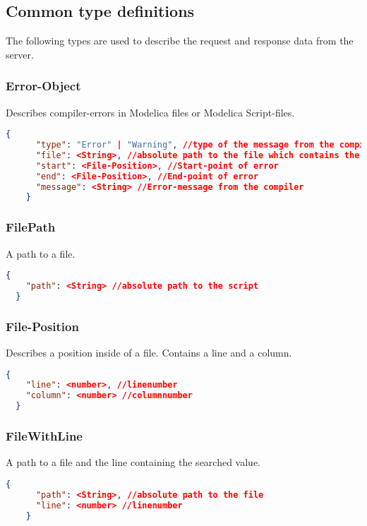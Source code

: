 \subsection{Common type definitions}
The following types are used to describe the request and response data
from the server.

\subsubsection{Error-Object}
Describes compiler-errors in Modelica files or Modelica Script-files.
\newline{}
  \begin{lstlisting}[basicstyle=\small,language=json]
    {
      "type": "Error" | "Warning", //type of the message from the compiler
      "file": <String>, //absolute path to the file which contains the error
      "start": <File-Position>, //Start-point of error
      "end": <File-Position>, //End-point of error
      "message": <String> //Error-message from the compiler
    }
  \end{lstlisting}

\subsubsection{FilePath}
A path to a file.
\newline{}
\begin{lstlisting}[basicstyle=\small,language=json]
  {
    "path": <String> //absolute path to the script
  }
\end{lstlisting}

\subsubsection{File-Position}
Describes a position inside of a file. Contains a
line and a column.
\newline{}
  \begin{lstlisting}[basicstyle=\small,language=json]
  {
    "line": <number>, //linenumber
    "column": <number> //columnnumber
  }
  \end{lstlisting}

  \subsubsection{FileWithLine}
  A path to a file and the line containing the searched value.
  \newline{}
  \begin{lstlisting}[basicstyle=\small,language=json]
    {
      "path": <String>, //absolute path to the file
      "line": <number> //linenumber
    }
  \end{lstlisting}

